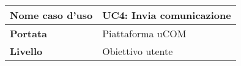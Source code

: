 
	\begin{longtable}[c]{|l|l|}
		\hline
		\textbf{Nome caso d'uso}                                                                          & UC4: Invia comunicazione                                                                           \\ \hline
		\endfirsthead
		\endhead
		\textbf{Portata}                                                                                  & Piattaforma uCOM                                                                                                                                                                                                                                                                                                                                                                                                                                                                                                                                                                                                                                                                                                                                                                                                                                                                                                                                                                                                                                                                                                                       \\ \hline
		\textbf{Livello}                                                                                  & Obiettivo utente                                                                                                                                                                                                                                                                                                                                                                                                                                                                                                                                                                                                                                                                                                                                                                                                                                                                                                                                                                                                                                                                                                                       \\ \hline

\end{longtable}
